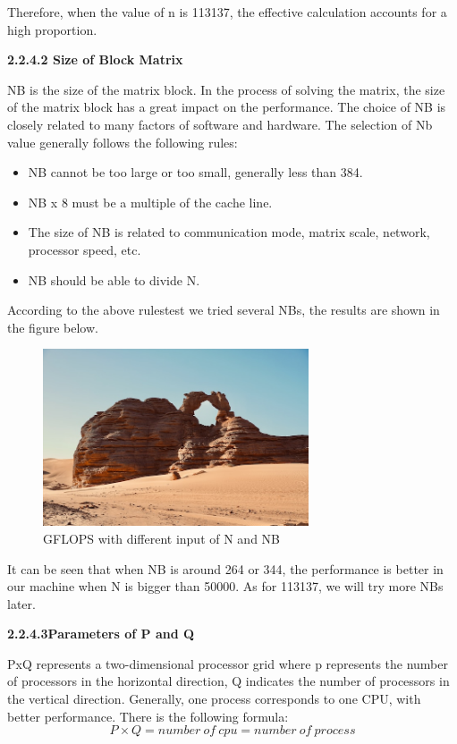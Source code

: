 \documentclass[a4paper,12pt]{article}
\begin{document}
Therefore, when the value of n is 113137, the effective calculation accounts for a high proportion.

\textbf{2.2.4.2 Size of Block Matrix}

NB is the size of the matrix block. In the process of solving the matrix, the size of the matrix block has a great impact on the performance. The choice of NB is closely related to many factors of software and hardware. The selection of Nb value generally follows the following rules:
\begin{itemize}
    \item NB cannot be too large or too small, generally less than 384.
    \item NB x 8 must be a multiple of the cache line.
    \item The size of NB is related to communication mode, matrix scale, network, processor speed, etc.
    \item NB should be able to divide N.
\end{itemize}

According to the above rulestest we tried several NBs, the results are shown in the figure below.

\begin{figure}[H]
    \centering
    \includegraphics[width=0.7\textwidth]{GFLOPS_NB.png}
    \caption{GFLOPS with different input of N and NB}
    \label{fig:gflops_nb}
\end{figure}

It can be seen that when NB is around 264 or 344, the performance is better in our machine when N is bigger than 50000. As for 113137, we will try more NBs later.

\textbf{2.2.4.3Parameters of P and Q}

PxQ represents a two-dimensional processor grid where p represents the number of processors in the horizontal direction, Q indicates the number of processors in the vertical direction. Generally, one process corresponds to one CPU, with better performance. There is the following formula:
\begin{equation*}
P \times Q = number\ of\ cpu = number\ of\ process
\end{equation*}
\end{document}
